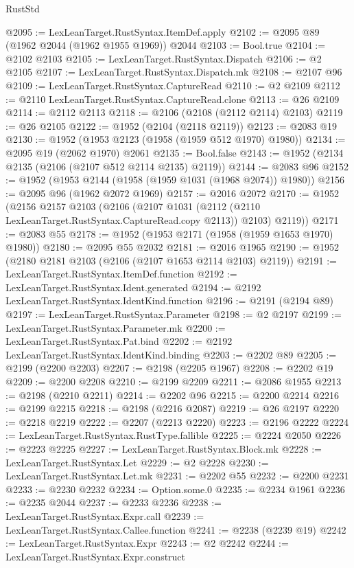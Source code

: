\begin{lexlean}{RustStd}
\begin{coremodule}
@2095 := LexLeanTarget.RustSyntax.ItemDef.apply
@2102 := @2095 @89 (@1962 @2044 (@1962 @1955 @1969)) @2044
@2103 := Bool.true
@2104 := @2102 @2103
@2105 := LexLeanTarget.RustSyntax.Dispatch
@2106 := @2 @2105
@2107 := LexLeanTarget.RustSyntax.Dispatch.mk
@2108 := @2107 @96
@2109 := LexLeanTarget.RustSyntax.CaptureRead
@2110 := @2 @2109
@2112 := @2110 LexLeanTarget.RustSyntax.CaptureRead.clone
@2113 := @26 @2109
@2114 := @2112 @2113
@2118 := @2106 (@2108 (@2112 @2114) @2103)
@2119 := @26 @2105
@2122 := @1952 (@2104 (@2118 @2119))
@2123 := @2083 @19
@2130 := @1952 (@1953 @2123 (@1958 (@1959 @512 @1970) @1980))
@2134 := @2095 @19 (@2062 @1970) @2061
@2135 := Bool.false
@2143 := @1952 (@2134 @2135 (@2106 (@2107 @512 @2114 @2135) @2119))
@2144 := @2083 @96
@2152 := @1952 (@1953 @2144 (@1958 (@1959 @1031 (@1968 @2074)) @1980))
@2156 := @2095 @96 (@1962 @2072 @1969)
@2157 := @2016 @2072
@2170 := @1952
    (@2156
      @2157
      @2103
      (@2106
        (@2107 @1031 (@2112 (@2110 LexLeanTarget.RustSyntax.CaptureRead.copy @2113)) @2103)
        @2119))
@2171 := @2083 @55
@2178 := @1952 (@1953 @2171 (@1958 (@1959 @1653 @1970) @1980))
@2180 := @2095 @55 @2032
@2181 := @2016 @1965
@2190 := @1952 (@2180 @2181 @2103 (@2106 (@2107 @1653 @2114 @2103) @2119))
@2191 := LexLeanTarget.RustSyntax.ItemDef.function
@2192 := LexLeanTarget.RustSyntax.Ident.generated
@2194 := @2192 LexLeanTarget.RustSyntax.IdentKind.function
@2196 := @2191 (@2194 @89)
@2197 := LexLeanTarget.RustSyntax.Parameter
@2198 := @2 @2197
@2199 := LexLeanTarget.RustSyntax.Parameter.mk
@2200 := LexLeanTarget.RustSyntax.Pat.bind
@2202 := @2192 LexLeanTarget.RustSyntax.IdentKind.binding
@2203 := @2202 @89
@2205 := @2199 (@2200 @2203)
@2207 := @2198 (@2205 @1967)
@2208 := @2202 @19
@2209 := @2200 @2208
@2210 := @2199 @2209
@2211 := @2086 @1955
@2213 := @2198 (@2210 @2211)
@2214 := @2202 @96
@2215 := @2200 @2214
@2216 := @2199 @2215
@2218 := @2198 (@2216 @2087)
@2219 := @26 @2197
@2220 := @2218 @2219
@2222 := @2207 (@2213 @2220)
@2223 := @2196 @2222
@2224 := LexLeanTarget.RustSyntax.RustType.fallible
@2225 := @2224 @2050
@2226 := @2223 @2225
@2227 := LexLeanTarget.RustSyntax.Block.mk
@2228 := LexLeanTarget.RustSyntax.Let
@2229 := @2 @2228
@2230 := LexLeanTarget.RustSyntax.Let.mk
@2231 := @2202 @55
@2232 := @2200 @2231
@2233 := @2230 @2232
@2234 := Option.some.{0}
@2235 := @2234 @1961
@2236 := @2235 @2044
@2237 := @2233 @2236
@2238 := LexLeanTarget.RustSyntax.Expr.call
@2239 := LexLeanTarget.RustSyntax.Callee.function
@2241 := @2238 (@2239 @19)
@2242 := LexLeanTarget.RustSyntax.Expr
@2243 := @2 @2242
@2244 := LexLeanTarget.RustSyntax.Expr.construct

\end{coremodule}
\end{lexlean}
